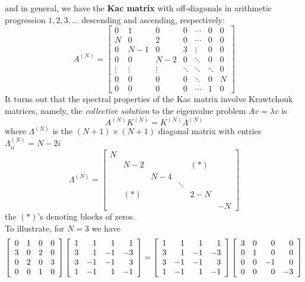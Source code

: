 \documentclass[12pt]{article}
\numberwithin{equation}{section}
\begin{document}
and in general, we have the {\bf Kac matrix} with off-diagonals in arithmetic progression 
$1,2,3,...$ descending and ascending, respectively:
$$
A^{(N)} =
  \left[\begin{array}{ccccccc} 
    0 & 1       & 0   & 0 &\cdots& 0&0 \\
    N & 0       & 2   & 0 &\cdots& 0&0 \\
    0 & N-1     & 0   & 3 &\vdots& 0&0 \\
    0 & 0       & N-2 & 0 &\ddots& 0&0 \\ 
  \vdots&\vdots&\vdots&\ddots&\ddots&\ddots &0\\
    0 & 0       & 0   & 0 &\ddots&0& N \\ 
    0 & 0       & 0   & 0 &\cdots&1& 0  
\end{array}\right]
$$ 
It turns out that the spectral properties of the Kac matrix 
involve Krawtchouk matrices, namely, the {\it collective solution} 
to the eigenvalue problem $Av=\lambda v$ is   
$$
A^{(N)}K^{(N)} =  K^{(N)} \Lambda^{(N)}
$$
where
$\Lambda^{(N)}$ is the $(N+1)\times(N+1)$ diagonal matrix with entries
$\Lambda^{(N)}_{ii}=N-2i$ 
$$
\Lambda^{(N)} =
  \left[\begin{array}{ccccccc} 
      N &     &    &  &  & \\
     & N-2 &    & & (\ast)& \\
     &     & N-4&   &&\\
     &     &    & \ddots &&\\ 
     &    (\ast)  &   &      &2-N  &\\ 
     &     &    &     &    & -N  
\end{array}\right]
$$ 
the  $(\ast)$'s denoting blocks of zeros.\\

To illustrate, for $N=3$ we have
$$
  \left[\begin{array}{rrrr} 
                0 & 1 & 0 & 0 \cr
                3 & 0 & 2 & 0 \cr
                0 & 2 & 0 & 3 \cr
                0 & 0 & 1 & 0 \cr \end{array}\right]
  \left[\begin{array}{rrrr} 
     1 &  1 &  1 &  1 \cr
     3 &  1 & -1 & -3 \cr
     3 & -1 & -1 &  3 \cr
     1 & -1 &  1 & -1 \cr \end{array}\right]
=
  \left[\begin{array}{rrrr} 
     1 &  1 &  1 &  1 \cr
     3 &  1 & -1 & -3 \cr
     3 & -1 & -1 &  3 \cr
     1 & -1 &  1 & -1 \cr \end{array}\right]
  \left[\begin{array}{rrrr} 
          3 & 0 & 0 & 0 \cr
          0 & 1 & 0 & 0 \cr
          0 & 0 & -1 & 0 \cr
          0 & 0 & 0 & -3 \cr \end{array}\right]
$$
\end{document}
